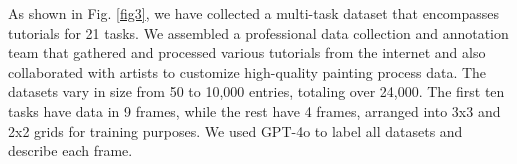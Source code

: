 As shown in Fig. \ref{fig3},  we have collected a multi-task dataset that encompasses tutorials for 21 tasks. We assembled a professional data collection and annotation team that gathered and processed various tutorials from the internet and also collaborated with artists to customize high-quality painting process data. The datasets vary in size from 50 to 10,000 entries, totaling over 24,000. The first ten tasks have data in 9 frames, while the rest have 4 frames, arranged into 3x3 and 2x2 grids for training purposes. We used GPT-4o to label all datasets and describe each frame.




